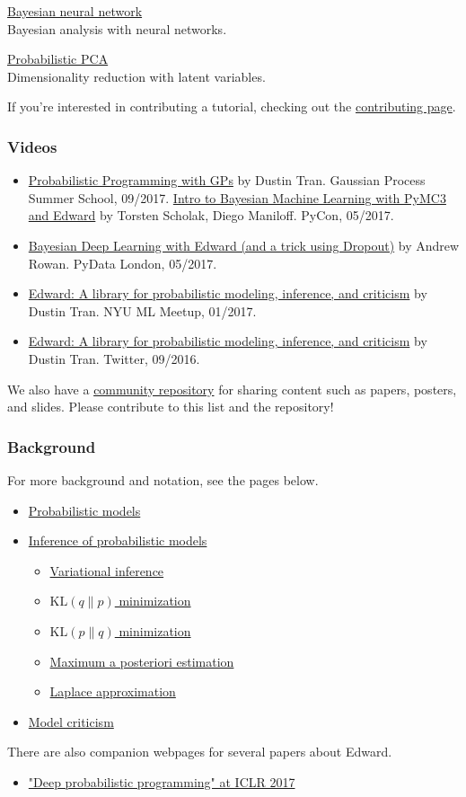 \href{bayesian-neural-network}{Bayesian neural network} \\
Bayesian analysis with neural networks.

\href{probabilistic-pca}{Probabilistic PCA} \\
Dimensionality reduction with latent variables.

If you're interested in contributing a tutorial, checking out the
\href{/contributing}{contributing page}.

\subsubsection{Videos}

\begin{itemize}
\item
\href{https://www.youtube.com/watch?list=PLpTp0l_CVmgwyAthrUmmdIFiunV1VvicM&v=1zNNLHyeWok}
{Probabilistic Programming with GPs}
by Dustin Tran. Gaussian Process Summer School, 09/2017.
\href{https://youtu.be/fR5Wvb86-IU}
{Intro to Bayesian Machine Learning with PyMC3 and Edward}
by Torsten Scholak, Diego Maniloff. PyCon, 05/2017.
\item
\href{https://www.youtube.com/watch?v=I09QVNrUS3Q}
{Bayesian Deep Learning with Edward (and a trick using Dropout)}
by Andrew Rowan. PyData London, 05/2017.
\item
\href{http://bit.ly/2k9QM3J}
{Edward: A library for probabilistic modeling, inference, and
criticism}
by Dustin Tran. NYU ML Meetup, 01/2017.
\item
\href{https://www.pscp.tv/hugo_larochelle/1yNGanvpOPjJj}
{Edward: A library for probabilistic modeling, inference, and criticism}
by Dustin Tran. Twitter, 09/2016.
\end{itemize}

We also have a
\href{https://github.com/edwardlib/papers}{community repository}
for sharing content such as papers, posters, and slides.
Please contribute to this list and the repository!

\subsubsection{Background}

For more background and notation, see the pages below.
\begin{itemize}
  \item \href{model}{Probabilistic models}
  \item \href{inference}{Inference of probabilistic models}
  \begin{itemize}
   \item \href{variational-inference}{Variational inference}
   \item \href{klqp}{$\text{KL}(q\|p)$ minimization}
   \item \href{klpq}{$\text{KL}(p\|q)$ minimization}
   \item \href{map}{Maximum a posteriori estimation}
   \item \href{map-laplace}{Laplace approximation}
  \end{itemize}
  \item \href{criticism}{Model criticism}
\end{itemize}

There are also companion webpages for several papers about Edward.
\begin{itemize}
\item
\href{/iclr2017}{"Deep probabilistic programming" at ICLR 2017}
\end{itemize}
